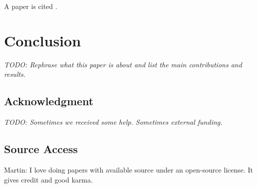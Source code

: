 \documentclass[a4paper,twocolumn]{article}
\newcommand{\todo}[1]{{\emph{TODO: #1}}}
\newcommand{\martin}[1]{{\color{blue} Martin: #1}}
\begin{document}
A paper is cited \cite{paper:example}.



\section{Conclusion}
\label{sec:conclusion}

\todo{Rephrase what this paper is about and list the main contributions and results.}

\subsection*{Acknowledgment}

\todo{Sometimes we received some help. Sometimes external funding.}



\subsection*{Source Access}

\martin{I love doing papers with available source under an
open-source license. It gives credit and good karma.}



\end{document}
